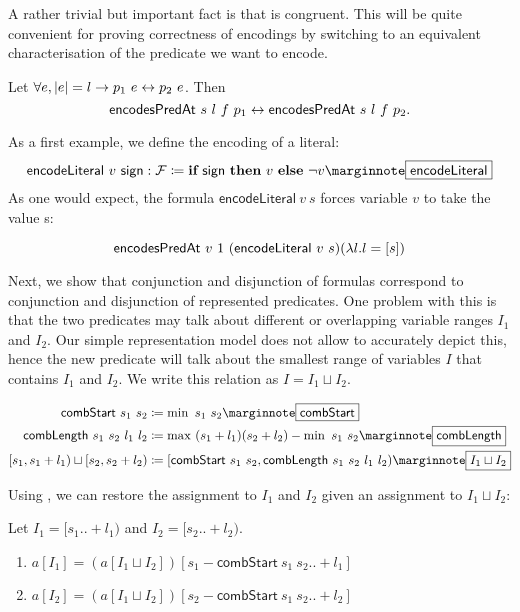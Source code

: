 A rather trivial but important fact is that \encodesPred{} is congruent. This will be quite convenient for proving correctness of encodings by switching to an equivalent characterisation of the predicate we want to encode.
\begin{fact}\label{fact:enc_congruent}
  Let $\forall e, |e| = l \rightarrow p_1~e \leftrightarrow p_2~e$. Then
  \[\textsf{encodesPredAt}~s~l~f~p_1 \leftrightarrow \textsf{encodesPredAt}~s~l~f~p_2. \]
\end{fact}

\newcommand{\encodeLiteral}{\textsf{encodeLiteral}}
As a first example, we define the encoding of a literal: 
\[\encodeLiteral~v~\textsf{sign} : \formula \defeq \ITE{\textsf{sign}}{v}{\lnot v} \mnote{\encodeLiteral}\]
As one would expect, the formula $\encodeLiteral~v~s$ forces variable $v$ to take the value s: 
\begin{proposition}[Correctness of \encodeLiteral]
  \[\encodesPred~v~1~(\encodeLiteral~v~s) (\lambda l. l = [s]) \]
\end{proposition}

Next, we show that conjunction and disjunction of formulas correspond to conjunction and disjunction of represented predicates. One problem with this is that the two predicates may talk about different or overlapping variable ranges $I_1$ and $I_2$. 
Our simple representation model does not allow to accurately depict this, hence the new predicate will talk about the smallest range of variables $I$ that contains $I_1$ and $I_2$. We write this relation as $I = I_1 \sqcup I_2$.

\newcommand{\cStart}{\textsf{combStart}}
\newcommand{\cLength}{\textsf{combLength}}
\begin{align*}
  \cStart~s_1~s_2 &\defeq \min~s_1~s_2 \mnote{\cStart}\\
  \cLength~s_1~s_2~l_1~l_2 &\defeq \max~(s_1 + l_1) (s_2 + l_2) - \min~s_1~s_2 \mnote{\cLength}\\
  [s_1, s_1 + l_1) \sqcup [s_2, s_2 + l_2) &\defeq [\cStart~s_1~s_2, \cLength~s_1~s_2~l_1~l_2) \mnote{$I_1 \sqcup I_2$}
\end{align*}

Using \projVars, we can restore the assignment to $I_1$ and $I_2$ given an assignment to $I_1 \sqcup I_2$:
\begin{proposition}\label{prop:comb_proj}
  Let $I_1 = [s_1 ..+ l_1)$ and $I_2 = [s_2 ..+l_2)$. 
  \begin{enumerate}
    \item $a[I_1] = (a[I_1 \sqcup I_2])[s_1 - \cStart~s_1~s_2 .. + l_1]$
    \item $a[I_2] = (a[I_1 \sqcup I_2])[s_2 - \cStart~s_1~s_2 .. + l_2]$
  \end{enumerate}
\end{proposition}

